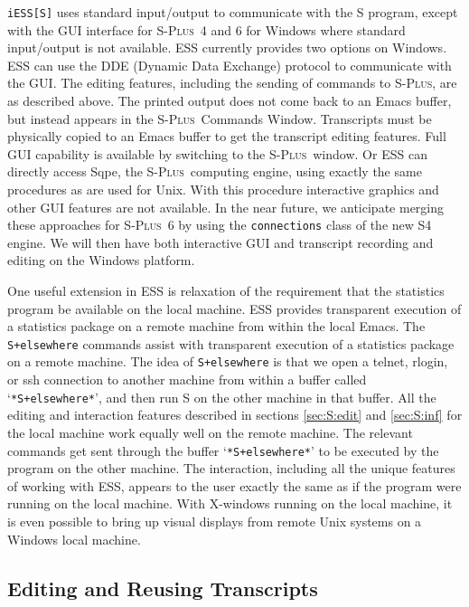 \documentclass{article}
\newcommand*{\Splus}{\textsc{S-Plus}}
\newcommand{\stexttt}[1]{{\small\texttt{#1}}}
\newcommand{\file}[1]{`\stexttt{#1}'}
\begin{document}
\stexttt{iESS[S]} uses standard input/output to communicate with the S
program, except with the GUI interface for \Splus\ 4 and 6 for Windows
where standard input/output is not available.  ESS currently provides
two options on Windows.  ESS can use the DDE (Dynamic Data Exchange)
protocol to communicate with the GUI.  The editing features, including
the sending of commands to \Splus, are as described above.  The
printed output does not come back to an Emacs buffer, but instead
appears in the \Splus\ Commands Window.  Transcripts must be
physically copied to an Emacs buffer to get the transcript editing
features.  Full GUI capability is available by switching to the
\Splus\ window.  Or ESS can directly access Sqpe, the \Splus\ 
computing engine, using exactly the same procedures as are used for
Unix.  With this procedure interactive graphics and other GUI features
are not available.  In the near future, we anticipate merging these
approaches for \Splus\ 6 by using the \stexttt{connections} class of
the new S4 engine.  We will then have both interactive GUI and
transcript recording and editing on the Windows platform.

One useful extension in ESS is relaxation of the requirement that the
statistics program be available on the local machine.  ESS provides
transparent execution of a statistics package on a remote machine from
within the local Emacs.  The \stexttt{S+elsewhere} commands assist
with transparent execution of a statistics package on a remote
machine.  The idea of \stexttt{S+elsewhere} is that we open a telnet,
rlogin, or ssh connection to another machine from within a buffer
called \file{*S+elsewhere*}, and then run S on the other machine in
that buffer.  All the editing and interaction features described in
sections \ref{sec:S:edit} and \ref{sec:S:inf} for the local machine
work equally well on the remote machine.  The relevant commands get
sent through the buffer \file{*S+elsewhere*} to be executed by the
program on the other machine.  The interaction, including all the
unique features of working with ESS, appears to the user exactly the
same as if the program were running on the local machine.  With
X-windows running on the local machine, it is even possible to bring
up visual displays from remote Unix systems on a Windows local
machine.

\subsection{Editing and Reusing Transcripts}
\label{sec:S:trans}
\end{document}
